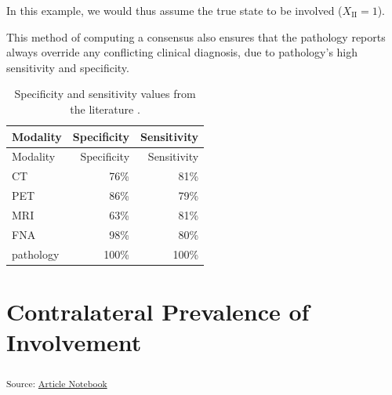 \documentclass[
  sn-mathphys-num,
]{sn-jnl}
\begin{document}
In this example, we would thus assume the true state to be involved
(\(X_\text{II} = 1\)).

This method of computing a consensus also ensures that the pathology
reports always override any conflicting clinical diagnosis, due to
pathology's high sensitivity and specificity.

\begin{longtable}[]{@{}lrr@{}}
\caption{Specificity and sensitivity values from the literature
\citep{debondt_detection_2007, kyzas_18ffluorodeoxyglucose_2008}.}\label{tbl-spec-sens}\tabularnewline
\toprule\noalign{}
Modality & Specificity & Sensitivity \\
\midrule\noalign{}
\endfirsthead
\toprule\noalign{}
Modality & Specificity & Sensitivity \\
\midrule\noalign{}
\endhead
\bottomrule\noalign{}
\endlastfoot
CT & 76\% & 81\% \\
PET & 86\% & 79\% \\
MRI & 63\% & 81\% \\
FNA & 98\% & 80\% \\
pathology & 100\% & 100\% \\
\end{longtable}

\section{Contralateral Prevalence of
Involvement}\label{contralateral-prevalence-of-involvement}

\textsubscript{Source:
\href{https://rmnldwg.github.io/bilateral-paper/manuscript.qmd.html}{Article
Notebook}}
\end{document}
